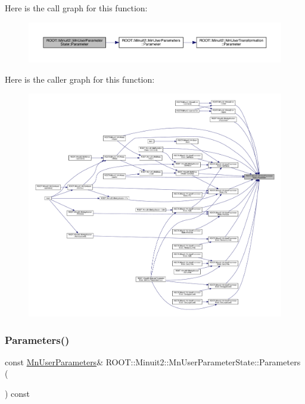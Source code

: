 Here is the call graph for this function\+:\nopagebreak
\begin{figure}[H]
\begin{center}
\leavevmode
\includegraphics[width=350pt]{d3/de0/classROOT_1_1Minuit2_1_1MnUserParameterState_a8a3fa916f75abaa442d96ab3af55a5af_cgraph}
\end{center}
\end{figure}
Here is the caller graph for this function\+:\nopagebreak
\begin{figure}[H]
\begin{center}
\leavevmode
\includegraphics[width=350pt]{d3/de0/classROOT_1_1Minuit2_1_1MnUserParameterState_a8a3fa916f75abaa442d96ab3af55a5af_icgraph}
\end{center}
\end{figure}
\mbox{\label{classROOT_1_1Minuit2_1_1MnUserParameterState_a486a8fc38e1581efd228ed43604e3fa7}} 
\subsubsection{\texorpdfstring{Parameters()}{Parameters()}\hspace{0.1cm}{\footnotesize\ttfamily [1/2]}}
{\footnotesize\ttfamily const \mbox{\hyperlink{classROOT_1_1Minuit2_1_1MnUserParameters}{Mn\+User\+Parameters}}\& R\+O\+O\+T\+::\+Minuit2\+::\+Mn\+User\+Parameter\+State\+::\+Parameters (\begin{DoxyParamCaption}{ }\end{DoxyParamCaption}) const\hspace{0.3cm}{\ttfamily [inline]}}

